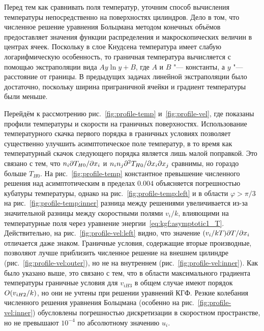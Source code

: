 Перед тем как сравнивать поля температур, уточним способ вычисления температуры
непосредственно на поверхностях цилиндров.
Дело в том, что численное решение уравнения Больцмана методом конечных объёмов
предоставляет значения функции распределения и макроскопических величин в центрах ячеек.
Поскольку в слое Кнудсена температура имеет слабую логарифмическую особенность,
то граничная температура вычисляется с помощью экстраполяции вида \(Ay\ln{y}+B\),
где \(A\) и \(B\) "--- константы, а \(y\) "--- расстояние от границы.
В предыдущих задачах линейной экстраполяции было достаточно,
поскольку ширина приграничной ячейки и градиент температуры были меньше.

Перейдём к рассмотрению рис.~\ref{fig:profile-temp} и~\ref{fig:profile-vel},
где показаны профили температуры и скорости на граничных поверхностях.
Использование температурного скачка первого порядка в граничных условиях
позволяет существенно улучшить асимптотическое поле температур,
в то время как температурный скачок следующего порядка является лишь малой поправкой.
Это связано с тем, что \(n_i\Pder[T_{H0}]{x_i}\) и \(n_in_j\Pderder[T_{H0}]{x_i}{x_j}\)
сравнимы, но гораздо больше \(T_{H0}\).
На рис.~\ref{fig:profile-temp} константное превышение численного решения над асимптотическим
в пределах \(0.004\) объясняется погрешностью кубатуры температуры,
однако на рис.~\ref{fig:profile-temp:left} и в области \(\varphi>\pi/3\) на рис.~\ref{fig:profile-temp:inner}
разница между решениями увеличивается из-за значительной разницы между скоростными полями \(v_i/k\),
влияющими на температурные поля через уравнение энергии~\eqref{eq:kgf:asymptotic1_T}.
Действительно, на рис.~\ref{fig:profile-vel:left} видно, что значение \((v_i/kT)\Pder[T]{x_i}\)
отличается даже знаком.
Граничные условия, содержащие вторые производные, позволяют лучше приблизить численное решение
на внешнем цилиндре (рис.~\ref{fig:profile-vel:outer}), но не на внутреннем (рис.~\ref{fig:profile-vel:inner}).
Как было указано выше, это связано с тем, что в области максимального градиента температуры
граничные условия для \(v_{iH3}\) в общем случае имеют порядок \(\OO{v_{iH2}/k}\),
но они не учтены при решении уравнений КГФ. Резкие колебания численного решения уравнения Больцмана
(особенно на рис.~\ref{fig:profile-vel:inner}) обусловлены погрешностью дискретизации в скоростном пространстве,
но не превышают \(10^{-4}\) по абсолютному значению \(u_i\).

\clearpage
